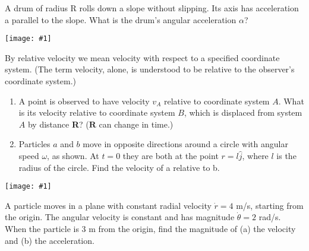\documentclass[12pt,letterpaper]{hmcpset}
\newcommand{\diagram}[1]{\begin{center}\texttt{[image: \#1]}\end{center}}
\begin{document}

\begin{problem}[1.17]

	A drum of radius R rolls down a slope without slipping. Its axis has acceleration a parallel to the slope. What is the drum’s angular acceleration $\alpha$?

    \diagram{img/1_17}

\end{problem}

\begin{solution}
\end{solution}
\newpage

\begin{problem}[1.19]

	By relative velocity we mean velocity with respect to a specified coordinate system. (The term velocity, alone, is understood to be relative to the observer’s coordinate system.)

	\begin{enumerate}
	\item
		A point is observed to have velocity $v_A$ relative to coordinate system $A$. What is its velocity relative to coordinate system $B$, which is displaced from system $A$ by distance \textbf{R}? ($\textbf{R}$ can change in time.)
	\item
		Particles $a$ and $b$ move in opposite directions around a circle with angular speed $\omega$, as shown. At $t = 0$ they are both at the point $r = l\hat{j}$, where $l$ is the radius of the circle.
		Find the velocity of a relative to b.
	\end{enumerate}

	\diagram{img/1_19}

\end{problem}
\newpage

\begin{solution}
\end{solution}

\begin{problem}[1.21]

	A particle moves in a plane with constant radial velocity $\dot{r} = 4$ m/s, starting from the origin. The angular velocity is constant and has magnitude $\dot{\theta} = 2$ rad/s. When the particle is 3 m from the origin, find the magnitude of (a) the velocity and (b) the acceleration.

\end{problem}
\end{document}
